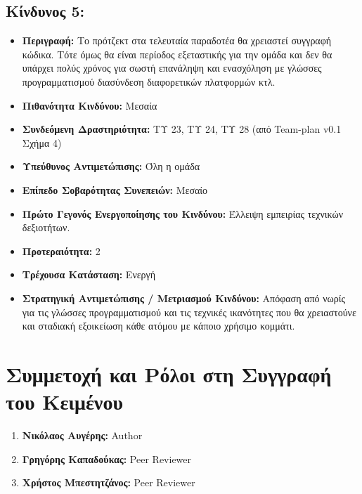 \documentclass[12pt,a4paper]{article}
\begin{document}
\subsection*{Κίνδυνος 5:}
\begin{itemize}
	\item \textbf{Περιγραφή:} Το πρότζεκτ στα τελευταία παραδοτέα θα χρειαστεί συγγραφή κώδικα. Τότε όμως θα είναι περίοδος εξεταστικής για την ομάδα και δεν θα υπάρχει πολύς χρόνος για σωστή επανάληψη και ενασχόληση με γλώσσες προγραμματισμού διασύνδεση διαφορετικών πλατφορμών κτλ.
	\item \textbf{Πιθανότητα Κινδύνου:} Μεσαία
	\item \textbf{Συνδεόμενη Δραστηριότητα:} ΤΥ 23, ΤΥ 24, ΤΥ 28 (από Team-plan v0.1 Σχήμα 4)
	\item \textbf{Υπεύθυνος Αντιμετώπισης:} Όλη η ομάδα
	\item \textbf{Επίπεδο Σοβαρότητας Συνεπειών:} Μεσαίο
	\item \textbf{Πρώτο Γεγονός Ενεργοποίησης του Κινδύνου:} Έλλειψη εμπειρίας τεχνικών δεξιοτήτων.
	\item \textbf{Προτεραιότητα:} 2
	\item \textbf{Τρέχουσα Κατάσταση:} Ενεργή
	\item \textbf{Στρατηγική Αντιμετώπισης / Μετριασμού Κινδύνου:} Απόφαση από νωρίς για τις γλώσσες προγραμματισμού και τις τεχνικές ικανότητες που θα χρειαστούνε και σταδιακή εξοικείωση κάθε ατόμου με κάποιο χρήσιμο κομμάτι.
\end{itemize}

\section{Συμμετοχή και Ρόλοι στη Συγγραφή του Κειμένου}
\begin{enumerate}
	\item \textbf{Νικόλαος Αυγέρης:} Author
	\item \textbf{Γρηγόρης Καπαδούκας:} Peer Reviewer
	\item \textbf{Χρήστος Μπεστητζάνος:} Peer Reviewer
\end{enumerate}
\end{document}

